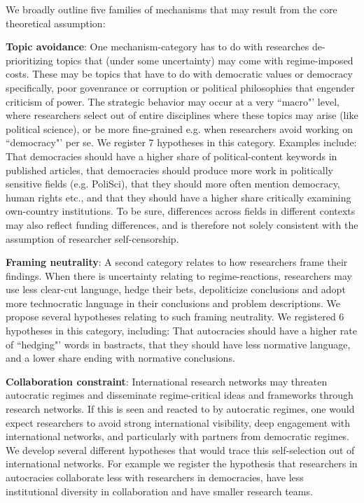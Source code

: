 \documentclass[12pt,a4paper]{article}
\newcommand{\kw}[1]{\textbf{#1}}
\begin{document}
We broadly outline five families of mechanisms that may result from the core theoretical assumption: 

\kw{Topic avoidance}: One mechanism-category has to do with researches de-prioritizing topics that (under some uncertainty) may come with regime-imposed costs. These may be topics that have to do with democratic values or democracy specifically, poor govenrance or corruption or political philosophies that engender criticism of power. The strategic behavior may occur at a very ``macro"' level, where researchers select out of entire disciplines where these topics may arise (like political science), or be more fine-grained e.g. when researchers avoid working on ``democracy"' per se. We register 7 hypotheses in this category. Examples include: That democracies  should have a higher share of political-content keywords in published articles, that democracies should produce more work in politically sensitive fields (e.g. PoliSci), that they should more often mention democracy, human rights etc., and that they should have a higher share critically examining own-country institutions. To be sure, differences across fields in different contexts may also reflect funding differences, and is therefore not solely consistent with the assumption of researcher self-censorship.  

\kw{Framing neutrality}: A second category relates to how researchers frame their findings. When there is uncertainty relating to regime-reactions, researchers may use less clear-cut language, hedge their bets, depoliticize conclusions and adopt more technocratic language in their conclusions and problem descriptions. We propose several hypotheses relating to such framing neutrality. We registered 6 hypotheses in this category, including: That autocracies should have a higher rate of ``hedging"' words in bastracts, that they should have less normative language, and a lower share ending with normative conclusions. 


\kw{Collaboration constraint}: International research networks may threaten autocratic regimes and disseminate regime-critical ideas and frameworks through research networks. If this is seen and reacted to by autocratic regimes, one would expect researchers to avoid strong international visibility, deep engagement with international networks, and particularly with partners from democratic regimes. We develop several different hypotheses that would trace this self-selection out of international networks. For example we register the hypothesis that researchers in autocracies collaborate less with researchers in democracies, have less institutional diversity in collaboration and have smaller research teams. 
\end{document}
